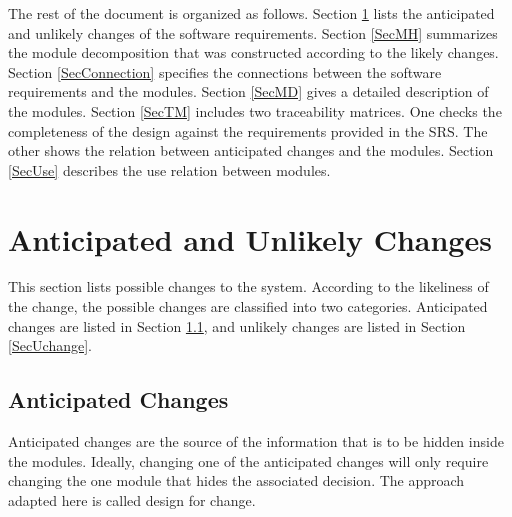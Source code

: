 \documentclass[12pt, titlepage]{article}
\begin{document}
The rest of the document is organized as follows. Section
\ref{SecChange} lists the anticipated and unlikely changes of the software
requirements. Section \ref{SecMH} summarizes the module decomposition that
was constructed according to the likely changes. Section \ref{SecConnection}
specifies the connections between the software requirements and the
modules. Section \ref{SecMD} gives a detailed description of the
modules. Section \ref{SecTM} includes two traceability matrices. One checks
the completeness of the design against the requirements provided in the SRS. The
other shows the relation between anticipated changes and the modules. Section
\ref{SecUse} describes the use relation between modules.

\section{Anticipated and Unlikely Changes} \label{SecChange}

This section lists possible changes to the system. According to the likeliness
of the change, the possible changes are classified into two
categories. Anticipated changes are listed in Section \ref{SecAchange}, and
unlikely changes are listed in Section \ref{SecUchange}.

\subsection{Anticipated Changes} \label{SecAchange}

Anticipated changes are the source of the information that is to be hidden
inside the modules. Ideally, changing one of the anticipated changes will only
require changing the one module that hides the associated decision. The approach
adapted here is called design for
change.
\end{document}
